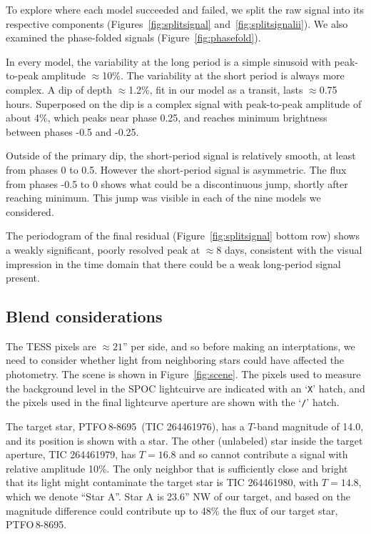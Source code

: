 \documentclass[12pt,twocolumn,tighten]{aastex62}
\newcommand{\ptfo}{PTFO$\,$8-8695}
\begin{document}
To explore where each model succeeded and failed, we split the raw
signal into its respective components (Figures~\ref{fig:splitsignal}
and~\ref{fig:splitsignalii}).  We also examined the phase-folded
signals (Figure~\ref{fig:phasefold}).  

In every model, the variability at the long period is a simple
sinusoid with peak-to-peak amplitude $\approx$10\%.  The variability
at the short period is always more complex.  A dip of depth
$\approx$1.2\%, fit in our model as a transit, lasts $\approx$0.75
hours.  Superposed on the dip is a complex signal with peak-to-peak
amplitude of about 4\%, which peaks near phase 0.25, and reaches
minimum brightness between phases -0.5 and -0.25.

Outside of the primary dip, the short-period signal is relatively
smooth, at least from phases 0 to 0.5.  However the short-period
signal is asymmetric.  The flux from phases -0.5 to 0 shows what could
be a discontinuous jump, shortly after reaching minimum.  This jump
was visible in each of the nine models we considered.

The periodogram of the final residual (Figure~\ref{fig:splitsignal}
bottom row) shows a weakly significant, poorly resolved peak at
$\approx$8 days, consistent with the visual impression in the time
domain that there could be a weak long-period signal present.


\subsection{Blend considerations}
\label{subsec:blend}

The TESS pixels are $\approx21$'' per side, and so before making an
interptations, we need to consider whether light from neighboring
stars could have affected the photometry.  The scene is shown in
Figure~\ref{fig:scene}.  The pixels used to measure the background
level in the SPOC lightcuirve are indicated with an `\texttt{X}'
hatch, and the pixels used in the final lightcurve aperture are shown
with the `\texttt{/}' hatch.

The target star, \ptfo\ (TIC 264461976), has a $T$-band magnitude
of 14.0, and its position is shown with a star.  The other (unlabeled)
star inside the target aperture, TIC 264461979, has $T=16.8$ and so
cannot contribute a signal with relative amplitude 10\%.  The only
neighbor that is sufficiently close and bright that its light might
contaminate the target star is TIC 264461980, with $T=14.8$, which we
denote ``Star A''.  Star A is 23.6'' NW of our target, and based on
the magnitude difference could contribute up to 48\% the flux of our
target star, \ptfo.  
\end{document}
